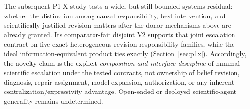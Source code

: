 The subsequent P1-X study tests a wider but still bounded systems residual: whether the distinction among causal responsibility, best intervention, and scientifically justified revision matters after the donor mechanisms above are already granted. Its comparator-fair disjoint V2 supports that joint escalation contract on five exact heterogeneous revision-responsibility families, while the ideal information-equivalent product ties exactly (Section~\ref{sec:p1x}). Accordingly, the novelty claim is the explicit \emph{composition and interface discipline} of minimal scientific escalation under the tested contracts, not ownership of belief revision, diagnosis, repair assignment, model expansion, authorization, or any inherent centralization/expressivity advantage. Open-ended or deployed scientific-agent generality remains undetermined.
